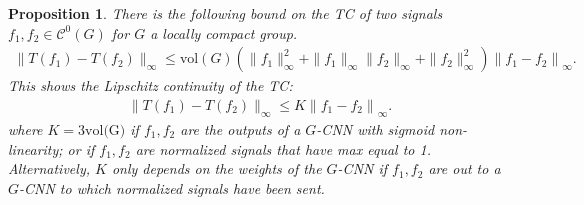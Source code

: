 \documentclass{article}
\newtheorem{proposition}{Proposition}
\begin{document}
\begin{proposition} There is the following bound on the TC of two signals $f_1, f_2 \in \mathcal{C}^0(G)$ for $G$ a locally compact group.
    \begin{align*}
 \|T\left(f_1\right)-T(f_2)\|_\infty
    \leq \text{vol}(G) \left( \|f_1\|_\infty^2 + \|f_1\|_\infty\|f_2\|_\infty + \|f_2\|_\infty^2\right) \left\|f_1-f_2\right\|_{\infty}.
\end{align*}
This shows the Lipschitz continuity of the TC:
    \begin{align*}
 \|T\left(f_1\right)-T(f_2)\|_\infty
    \leq K \left\|f_1-f_2\right\|_{\infty}.
\end{align*}
where $K = 3 \text{vol(G)}$ if $f_1, f_2$ are the outputs of a $G$-CNN with sigmoid non-linearity; or if $f_1, f_2$ are normalized signals that have max equal to 1. Alternatively, $K$ only depends on the weights of the $G$-CNN if $f_1, f_2$ are out to a $G$-CNN to which normalized signals have been sent.
\end{proposition}
\end{document}

